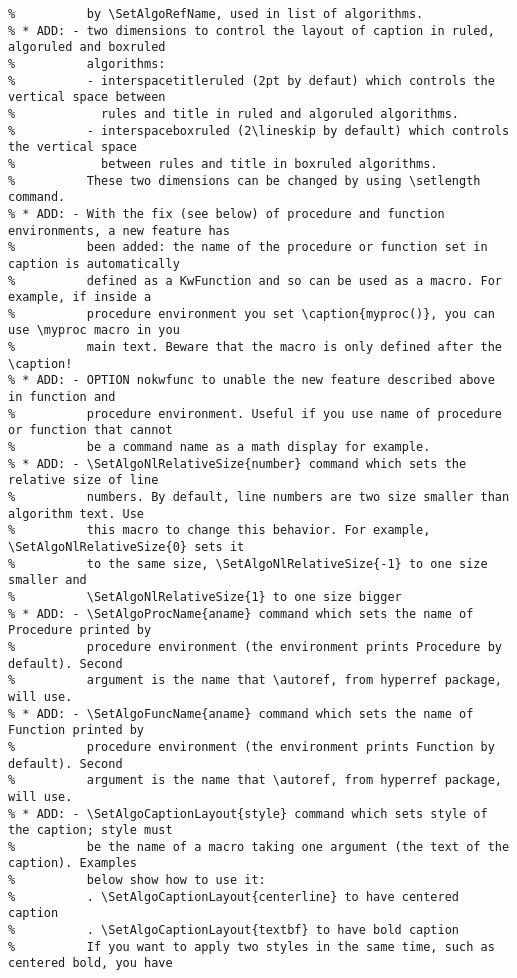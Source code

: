 \documentclass[a4paper]{article}
\begin{document}
\begin{verbatim}
%          by \SetAlgoRefName, used in list of algorithms.
% * ADD: - two dimensions to control the layout of caption in ruled, algoruled and boxruled
%          algorithms:
%          - interspacetitleruled (2pt by defaut) which controls the vertical space between
%            rules and title in ruled and algoruled algorithms.
%          - interspaceboxruled (2\lineskip by default) which controls the vertical space
%            between rules and title in boxruled algorithms.
%          These two dimensions can be changed by using \setlength command.
% * ADD: - With the fix (see below) of procedure and function environments, a new feature has
%          been added: the name of the procedure or function set in caption is automatically
%          defined as a KwFunction and so can be used as a macro. For example, if inside a
%          procedure environment you set \caption{myproc()}, you can use \myproc macro in you
%          main text. Beware that the macro is only defined after the \caption!
% * ADD: - OPTION nokwfunc to unable the new feature described above in function and
%          procedure environment. Useful if you use name of procedure or function that cannot
%          be a command name as a math display for example.
% * ADD: - \SetAlgoNlRelativeSize{number} command which sets the relative size of line
%          numbers. By default, line numbers are two size smaller than algorithm text. Use
%          this macro to change this behavior. For example, \SetAlgoNlRelativeSize{0} sets it
%          to the same size, \SetAlgoNlRelativeSize{-1} to one size smaller and
%          \SetAlgoNlRelativeSize{1} to one size bigger
% * ADD: - \SetAlgoProcName{aname} command which sets the name of Procedure printed by
%          procedure environment (the environment prints Procedure by default). Second
%          argument is the name that \autoref, from hyperref package, will use. 
% * ADD: - \SetAlgoFuncName{aname} command which sets the name of Function printed by
%          procedure environment (the environment prints Function by default). Second
%          argument is the name that \autoref, from hyperref package, will use. 
% * ADD: - \SetAlgoCaptionLayout{style} command which sets style of the caption; style must
%          be the name of a macro taking one argument (the text of the caption). Examples
%          below show how to use it:
%          . \SetAlgoCaptionLayout{centerline} to have centered caption
%          . \SetAlgoCaptionLayout{textbf} to have bold caption
%          If you want to apply two styles in the same time, such as centered bold, you have

\end{verbatim}
\end{document}
